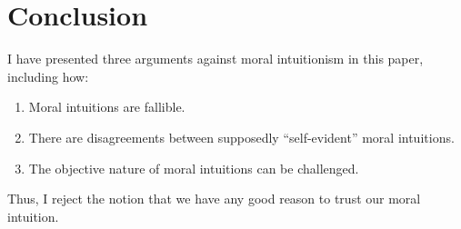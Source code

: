 \documentclass[12pt, a4paper, twoside]{article}
\begin{document}
\section{Conclusion}

I have presented three arguments against moral intuitionism in this paper, including how:

\begin{enumerate}
\item Moral intuitions are fallible.

\item There are disagreements between supposedly ``self-evident'' moral intuitions.

\item The objective nature of moral intuitions can be challenged.
\end{enumerate}

Thus, I reject the notion that we have any good reason to trust our moral intuition.

\printbibliography
\end{document}
